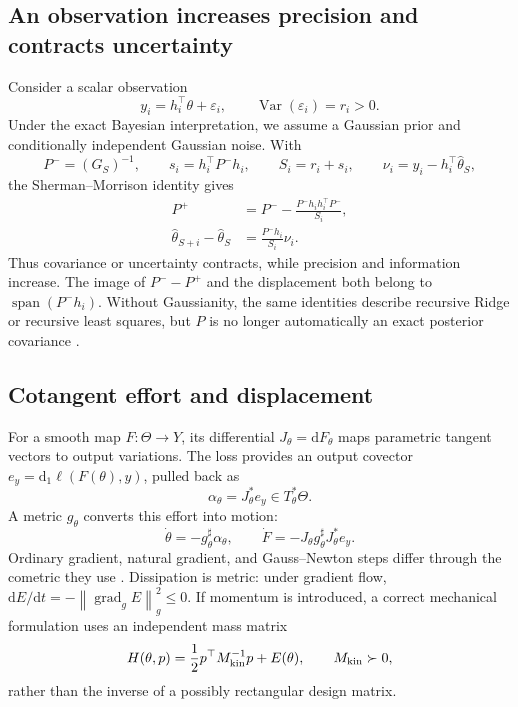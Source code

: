 \documentclass[10pt,a4paper]{article}
\newcommand{\Span}{\operatorname{span}}
\newcommand{\norm}[1]{\left\lVert #1\right\rVert}
\newcommand{\dd}{\mathrm d}
\begin{document}
\subsection{An observation increases precision and contracts uncertainty}
Consider a scalar observation
\[
y_i=h_i^\top\theta+\varepsilon_i,\qquad \operatorname{Var}(\varepsilon_i)=r_i>0.
\]
Under the exact Bayesian interpretation, we assume a Gaussian prior and conditionally independent Gaussian noise. With
\[
P^-=(G_S)^{-1},\qquad s_i=h_i^\top P^-h_i,
\qquad S_i=r_i+s_i,
\qquad \nu_i=y_i-h_i^\top\widehat\theta_S,
\]
the Sherman--Morrison identity \citep{sherman1950} gives
\begin{align}
P^+&=P^--\frac{P^-h_ih_i^\top P^-}{S_i},\label{eq:cov-update}\\
\widehat\theta_{S+i}-\widehat\theta_S
&=\frac{P^-h_i}{S_i}\nu_i.\label{eq:mean-update}
\end{align}
Thus covariance or uncertainty contracts, while precision and information increase. The image of $P^--P^+$ and the displacement both belong to $\Span(P^-h_i)$. Without Gaussianity, the same identities describe recursive Ridge or recursive least squares, but $P$ is no longer automatically an exact posterior covariance \citep{kalman1960,ollivier2017}.

\subsection{Cotangent effort and displacement}
For a smooth map $F:\Theta\to Y$, its differential $J_\theta=\dd F_\theta$ maps parametric tangent vectors to output variations. The loss provides an output covector $e_y=\dd_1\ell(F(\theta),y)$, pulled back as
\[
\alpha_\theta=J_\theta^*e_y\in T_\theta^*\Theta.
\]
A metric $g_\theta$ converts this effort into motion:
\begin{equation}
\dot\theta=-g_\theta^\sharp\alpha_\theta,
\qquad
\dot F=-J_\theta g_\theta^\sharp J_\theta^*e_y.
\end{equation}
Ordinary gradient, natural gradient, and Gauss--Newton steps differ through the cometric they use \citep{amari1998,ollivier2015,martens2020}. Dissipation is metric: under gradient flow, $\dd E/\dd t=-\norm{\operatorname{grad}_gE}_g^2\leq0$. If momentum is introduced, a correct mechanical formulation uses an independent mass matrix
\[
H(\theta,p)=\frac12p^\top M_{\rm kin}^{-1}p+E(\theta),\qquad M_{\rm kin}\succ0,
\]
rather than the inverse of a possibly rectangular design matrix.
\end{document}

